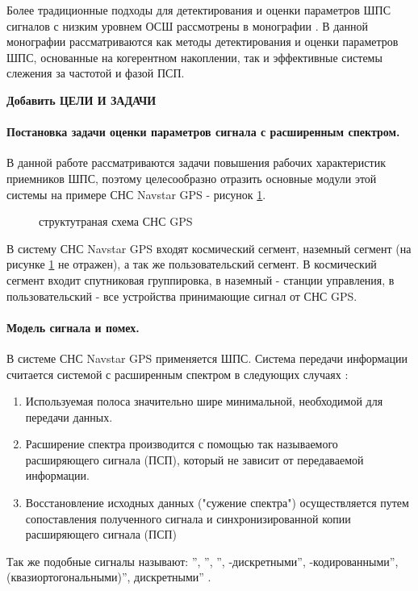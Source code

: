 Более традиционные подходы для детектирования и оценки параметров ШПС сигналов с низким уровнем ОСШ рассмотрены в монографии \cite{ziedan-book}.
В данной монографии рассматриваются как методы детектирования и оценки параметров ШПС, основанные на когерентном накоплении, так и эффективные
системы слежения за частотой и фазой ПСП.

{\bf{Добавить ЦЕЛИ И ЗАДАЧИ}}

\paragraph{Постановка задачи оценки параметров сигнала с расширенным спектром.}
В данной работе рассматриваются задачи повышения рабочих характеристик приемников ШПС, поэтому целесообразно отразить основные модули этой системы 
на примере СНС Navstar GPS - рисунок \ref{pic:sec1_gnss_system}.
\begin{figure}[H]
\center{}
\caption{структутраная схема СНС GPS}
\label{pic:sec1_gnss_system}
\end{figure}

В систему СНС Navstar GPS входят космический сегмент, наземный сегмент (на рисунке \ref{pic:sec1_gnss_system} не
отражен), а так же пользовательский сегмент. В космический сегмент входит спутниковая группировка, в 
наземный - станции управления, в пользовательский - все устройства принимающие сигнал от СНС GPS.

\paragraph{Модель сигнала и помех.}
В системе СНС Navstar GPS применяется ШПС.
Система передачи информации считается системой с расширенным спектром в следующих случаях \cite{sklyar}:
\begin{enumerate}
	\item Используемая полоса значительно шире минимальной, необходимой для передачи данных.
	\item Расширение спектра производится с помощью так называемого расширяющего сигнала (ПСП),
		который не зависит от передаваемой информации.
	\item Восстановление исходных данных ("сужение спектра") осуществляется путем сопоставления полученного
		сигнала и синхронизированной копии расширяющего сигнала (ПСП)
\end{enumerate}

Так же подобные сигналы называют:
\textquotedblright,
\textquotedblright,
\textquotedblright,
-дискретными\textquotedblright,
-кодированными\textquotedblright,
 (квазиортогональными)\textquotedblright,
 дискретными\textquotedblright
\cite{gantmaher-book}.

